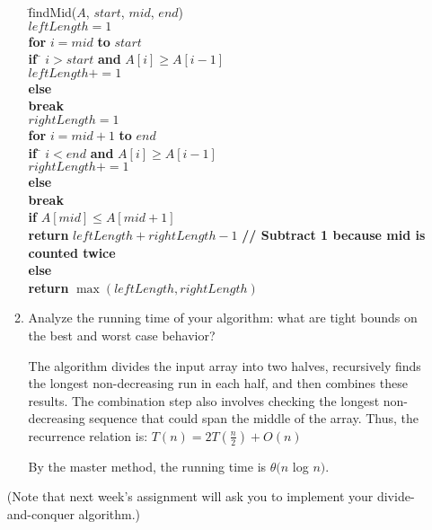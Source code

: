 \documentclass[11pt]{article}
\begin{document}
\begin{enumerate}
\begin{enumerate}
\begin{tabbing}
\hspace*{1cm} \= findMid($A$, $start$, $mid$, $end$) \\
\> $leftLength = 1$ \\
\> \hspace*{.5cm} \= {\bf for} $i = mid$ \= {\bf to} $start$ \\
\>\>\> {\bf if} \= $i > start$ {\bf and} $A[i] \geq A[i - 1]$ \\
\>\>\>\> $leftLength += 1$ \\
\>\>\> {\bf else} \\
\>\>\>\> {\bf break} \\
\> $rightLength = 1$ \\
\> \hspace*{.5cm} \= {\bf for} $i = mid + 1$ \= {\bf to} $end$ \\
\>\>\> {\bf if} \= $i < end$ {\bf and} $A[i] \geq A[i - 1]$ \\
\>\>\>\> $rightLength += 1$ \\
\>\>\> {\bf else} \\
\>\>\>\> {\bf break} \\
\> {\bf if} $A[mid] \leq A[mid + 1]$ \\
\>\> {\bf return} $leftLength + rightLength - 1$ \= {\bf // Subtract 1 because mid is counted twice} \\
\> {\bf else} \\
\>\> {\bf return} $\max(leftLength, rightLength)$ \\
\end{tabbing}


\pagebreak
\item Analyze the running time of your algorithm: what are tight
  bounds on the best and worst case behavior?


The algorithm divides the input array into two halves, recursively finds the longest non-decreasing run in each half, and then combines these results. The combination step also involves checking the longest non-decreasing sequence that could span the middle of the array.
Thus, the recurrence relation is: 
$T(n)=2 T\left(\frac{n}{2}\right)+O(n)$

By the master method, the running time is $\theta(n$ log $n)$.

\end{enumerate}

(Note that next week's assignment will ask you to implement your divide-and-conquer algorithm.)

\end{enumerate}
\end{document}
